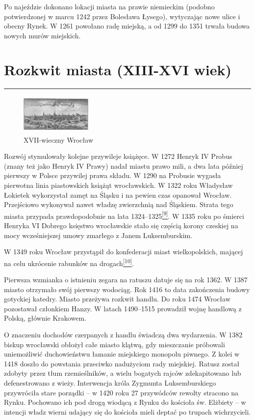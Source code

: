 \documentclass{article}
\begin{document}
Po najeździe dokonano lokacji miasta na prawie niemieckim (podobno potwierdzonej w marcu 1242 przez Bolesława Łysego), wytyczając nowe ulice i obecny Rynek. W 1261 powołano radę miejską, a od 1299 do 1351 trwała budowa nowych murów miejskich.

\section{Rozkwit miasta (XIII-XVI wiek)}
\noindent\rule{\textwidth}{0.4pt}

\begin{figure}
    \includegraphics[width =3.5cm, height = 2.0cm]{images/Zdjecie03.JPG}
    \caption{XVII-wieczny Wrocław}
\end{figure}

Rozwój stymulowały kolejne przywileje książęce. W 1272 Henryk IV Probus (znany też jako Henryk IV Prawy) nadał miastu prawo mili, a dwa lata później pierwszy w Polsce przywilej prawa składu. W 1290 na Probusie wygasła pierwotna linia piastowskich książąt wrocławskich. W 1322 roku Władysław Łokietek wykorzystał zamęt na Śląsku i na pewien czas opanował Wrocław. Przejściowo wykonywał nawet władzę zwierzchnią nad Śląskiem. Strata tego miasta przypada prawdopodobnie na lata 1324–1325\hyperlink{9}{\textsuperscript{[9]}}. W 1335 roku po śmierci Henryka VI Dobrego księstwo wrocławskie stało się częścią korony czeskiej na mocy wcześniejszej umowy zmarłego z Janem Luksemburskim.

W 1349 roku Wrocław przystąpił do konfederacji miast wielkopolskich, mającej na celu ukrócenie rabunków na drogach\hyperlink{10}{\textsuperscript{[10]}}.

Pierwsza wzmianka o istnieniu zegara na ratuszu datuje się na rok 1362. W 1387 miasto otrzymało swój pierwszy wodociąg. Rok 1416 to data zakończenia budowy gotyckiej katedry. Miasto przeżywa rozkwit handlu. Do roku 1474 Wrocław pozostawał członkiem Hanzy. W latach 1490–1515 prowadził wojnę handlową z Polską, głównie Krakowem.

O znaczeniu dochodów czerpanych z handlu świadczą dwa wydarzenia. W 1382 biskup wrocławski obłożył całe miasto klątwą, gdy mieszczanie próbowali uniemożliwić duchowieństwu łamanie miejskiego monopolu piwnego. Z kolei w 1418 doszło do powstania przeciwko nadużyciom rady miejskiej. Ratusz został zdobyty przez tłum rzemieślników, a wielu bogatych rajców zdekapitowano lub defenestrowano z wieży. Interwencja króla Zygmunta Luksemburskiego przywróciła stare porządki – w 1420 roku 27 przywódców rewolty stracono na Rynku. Pochowano ich pod drogą wiodącą z Rynku do kościoła św. Elżbiety – w intencji władz wierni udający się do kościoła mieli deptać po trupach wichrzycieli.
\end{document}
